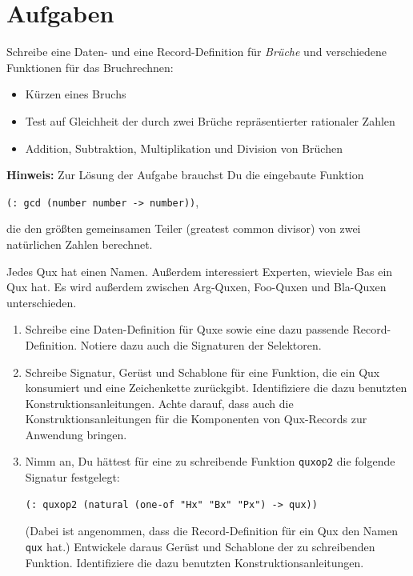 \section*{Aufgaben}

\begin{aufgabe}

  Schreibe eine Daten- und eine
  Record-Definition für \textit{Brüche} und verschiedene Funktionen
  für das Bruchrechnen:
  \begin{itemize}
  \item Kürzen eines Bruchs
  \item Test auf Gleichheit der durch zwei Brüche repräsentierter
    rationaler Zahlen
  \item Addition, Subtraktion, Multiplikation und Division von
    Brüchen
  \end{itemize}

  \textbf{Hinweis:} Zur Lösung der Aufgabe brauchst Du die eingebaute
  Funktion
  \begin{center}
    \texttt{(: gcd (number number -> number))},
  \end{center}
  die den größten gemeinsamen Teiler (greatest common divisor) von
  zwei natürlichen Zahlen berechnet.

\end{aufgabe}

\begin{aufgabe}

  Jedes Qux hat einen Namen.  Außerdem interessiert
  Experten, wieviele Bas ein Qux hat.  Es wird außerdem zwischen
  Arg-Quxen, Foo-Quxen und Bla-Quxen unterschieden.
  \begin{enumerate}
  \item Schreibe eine Daten-Definition für Quxe sowie eine dazu
    passende Record-Definition. Notiere dazu auch die Signaturen der
    Selektoren.
  \item Schreibe Signatur, Gerüst und Schablone für eine Funktion,
    die ein Qux konsumiert und eine Zeichenkette zurückgibt.
    Identifiziere die dazu benutzten Konstruktionsanleitungen.
    Achte darauf, dass auch die Konstruktionsanleitungen für die
    Komponenten von Qux-Records zur Anwendung bringen.
  \item Nimm an, Du hättest für eine zu schreibende Funktion
    \texttt{quxop2} die folgende Signatur festgelegt:
\begin{verbatim}
(: quxop2 (natural (one-of "Hx" "Bx" "Px") -> qux))
\end{verbatim}
    (Dabei ist angenommen, dass die Record-Definition für ein Qux
    den Namen \texttt{qux} hat.) Entwickele daraus Gerüst und
    Schablone der zu schreibenden Funktion.  Identifiziere die dazu
    benutzten Konstruktionsanleitungen.
  \end{enumerate}

\end{aufgabe}

